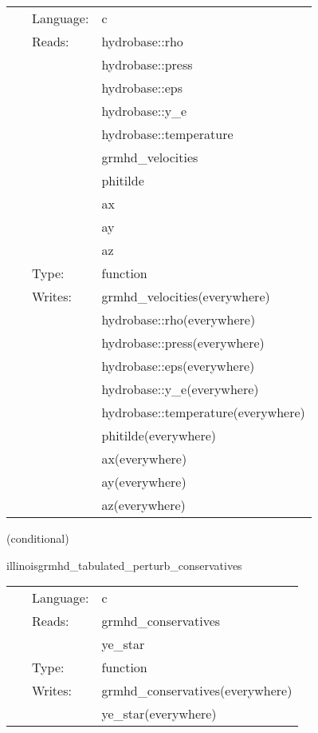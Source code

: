  \begin{tabular*}{160mm}{cll} 
~ & Language:  & c \\ 
~ & Reads:  & hydrobase::rho \\ 
~& ~ &hydrobase::press\\ 
~& ~ &hydrobase::eps\\ 
~& ~ &hydrobase::y\_e\\ 
~& ~ &hydrobase::temperature\\ 
~& ~ &grmhd\_velocities\\ 
~& ~ &phitilde\\ 
~& ~ &ax\\ 
~& ~ &ay\\ 
~& ~ &az\\ 
~ & Type:  & function \\ 
~ & Writes:  & grmhd\_velocities(everywhere) \\ 
~& ~ &hydrobase::rho(everywhere)\\ 
~& ~ &hydrobase::press(everywhere)\\ 
~& ~ &hydrobase::eps(everywhere)\\ 
~& ~ &hydrobase::y\_e(everywhere)\\ 
~& ~ &hydrobase::temperature(everywhere)\\ 
~& ~ &phitilde(everywhere)\\ 
~& ~ &ax(everywhere)\\ 
~& ~ &ay(everywhere)\\ 
~& ~ &az(everywhere)\\ 
\end{tabular*} 


\vspace{5mm}

   (conditional) 

\hspace{5mm} illinoisgrmhd\_tabulated\_perturb\_conservatives 

\hspace{5mm}{\it tabulated version of illinoisgrmhd\_perturb\_conservatives } 


\hspace{5mm}

 \begin{tabular*}{160mm}{cll} 
~ & Language:  & c \\ 
~ & Reads:  & grmhd\_conservatives \\ 
~& ~ &ye\_star\\ 
~ & Type:  & function \\ 
~ & Writes:  & grmhd\_conservatives(everywhere) \\ 
~& ~ &ye\_star(everywhere)\\ 
\end{tabular*} 



